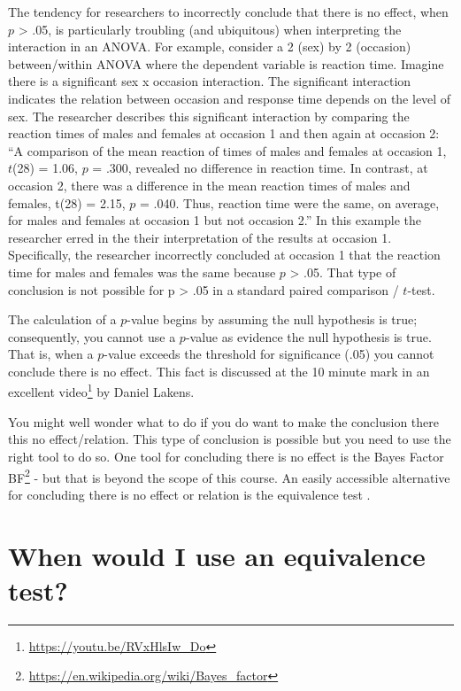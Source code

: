 \documentclass[
]{krantz}
\renewcommand{\href}[2]{#2\footnote{\url{#1}}}
\begin{document}
The tendency for researchers to incorrectly conclude that there is no effect, when \(p\) \textgreater{} .05, is particularly troubling (and ubiquitous) when interpreting the interaction in an ANOVA. For example, consider a 2 (sex) by 2 (occasion) between/within ANOVA where the dependent variable is reaction time. Imagine there is a significant sex x occasion interaction. The significant interaction indicates the relation between occasion and response time depends on the level of sex. The researcher describes this significant interaction by comparing the reaction times of males and females at occasion 1 and then again at occasion 2: ``A comparison of the mean reaction of times of males and females at occasion 1, \(t\)(28) = 1.06, \(p\) = .300, revealed no difference in reaction time. In contrast, at occasion 2, there was a difference in the mean reaction times of males and females, t(28) = 2.15, \(p\) = .040. Thus, reaction time were the same, on average, for males and females at occasion 1 but not occasion 2.'' In this example the researcher erred in the their interpretation of the results at occasion 1. Specifically, the researcher incorrectly concluded at occasion 1 that the reaction time for males and females was the same because \(p\) \textgreater{} .05. That type of conclusion is not possible for p \textgreater{} .05 in a standard paired comparison / \(t\)-test.

The calculation of a \(p\)-value begins by assuming the null hypothesis is true; consequently, you cannot use a \(p\)-value as evidence the null hypothesis is true. That is, when a \(p\)-value exceeds the threshold for significance (.05) you cannot conclude there is no effect. This fact is discussed at the 10 minute mark in an excellent \href{https://youtu.be/RVxHlsIw_Do}{video} by Daniel Lakens.

You might well wonder what to do if you do want to make the conclusion there this no effect/relation. This type of conclusion is possible but you need to use the right tool to do so. One tool for concluding there is no effect is the Bayes Factor \href{https://en.wikipedia.org/wiki/Bayes_factor}{BF} - but that is beyond the scope of this course. An easily accessible alternative for concluding there is no effect or relation is the equivalence test \citep{lakens2018equivalence}.

\hypertarget{when-would-i-use-an-equivalence-test}{%
\section{When would I use an equivalence test?}\label{when-would-i-use-an-equivalence-test}}
\end{document}
